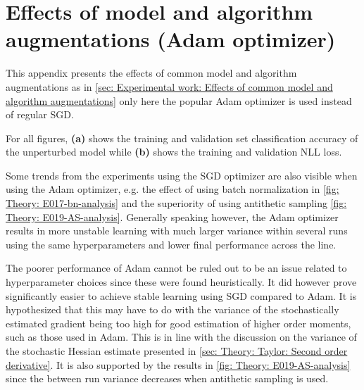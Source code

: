 
\chapter{Effects of model and algorithm augmentations (Adam optimizer)}\label{app: Effects of common model and algorithm augmentations (Adam optimizer)}
This appendix presents the effects of common model and algorithm augmentations as in \autoref{sec: Experimental work: Effects of common model and algorithm augmentations} only here the popular Adam optimizer \cite{Kingma2014} is used instead of regular \gls{SGD}. 

For all figures, \textbf{(a)} shows the training and validation set classification accuracy of the unperturbed model while \textbf{(b)} shows the training and validation \gls{NLL} loss.

Some trends from the experiments using the \gls{SGD} optimizer are also visible when using the Adam optimizer, e.g. the effect of using batch normalization in \autoref{fig: Theory: E017-bn-analysis} and the
superiority of using antithetic sampling \autoref{fig: Theory: E019-AS-analysis}. Generally speaking however, the Adam optimizer results in more unstable learning with much larger variance within several runs using the same hyperparameters and lower final performance across the line. 

The poorer performance of Adam cannot be ruled out to be an issue related to hyperparameter choices since these were found heuristically. It did however prove significantly easier to achieve stable learning using \gls{SGD} compared to Adam. It is hypothesized that this may have to do with the variance of the stochastically estimated gradient being too high for good estimation of higher order moments, such as those used in Adam. This is in line with the discussion on the variance of the stochastic Hessian estimate presented in \autoref{sec: Theory: Taylor: Second order derivative}. It is also supported by the results in \autoref{fig: Theory: E019-AS-analysis} since the between run variance decreases when antithetic sampling is used.

